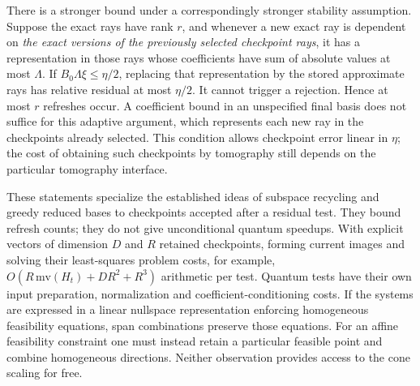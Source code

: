 There is a stronger bound under a correspondingly stronger stability
assumption.  Suppose the exact rays have rank $r$, and whenever a new exact
ray is dependent on \emph{the exact versions of the previously selected
checkpoint rays}, it has a representation in those rays whose coefficients
have sum of absolute values at most $\Lambda$.  If
$B_0\Lambda\xi\leq\eta/2$, replacing that representation by the stored
approximate rays has relative residual at most $\eta/2$.
It cannot trigger a rejection.  Hence at most $r$ refreshes occur.
A coefficient bound in an unspecified final basis does not suffice for
this adaptive argument, which represents each new ray in the checkpoints
already selected.  This condition allows checkpoint error
linear in $\eta$; the cost of obtaining such checkpoints by tomography
still depends on the particular tomography interface.

These statements specialize the established ideas of subspace recycling
and greedy reduced bases \citep{ParksEtAl2006,BinevEtAl2011} to checkpoints
accepted after a residual test.  They bound refresh counts; they do not
give unconditional quantum speedups.  With explicit vectors of dimension $D$
and $R$ retained checkpoints, forming current images and solving their
least-squares problem costs, for example,
$O(R\,\mathrm{mv}(H_t)+DR^2+R^3)$ arithmetic per test.
Quantum tests have their own input preparation, normalization and
coefficient-conditioning costs.  If the systems are expressed in a linear
nullspace representation enforcing homogeneous feasibility equations,
span combinations preserve those equations.  For an affine feasibility
constraint one must instead retain a particular feasible point and combine
homogeneous directions.  Neither observation provides access to the cone
scaling for free.

